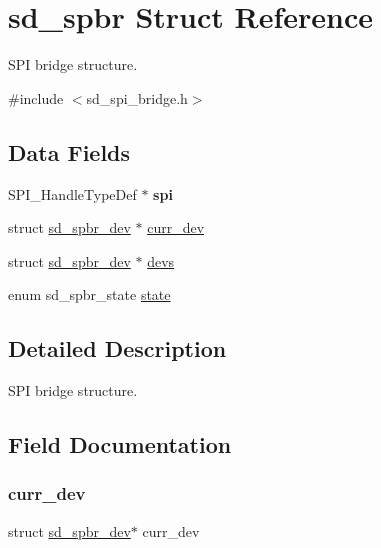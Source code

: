 \hypertarget{structsd__spbr}{}\section{sd\+\_\+spbr Struct Reference}
\label{structsd__spbr}


S\+PI bridge structure.  




{\ttfamily \#include $<$sd\+\_\+spi\+\_\+bridge.\+h$>$}

\subsection*{Data Fields}
\begin{DoxyCompactItemize}
\item 
\mbox{\label{structsd__spbr_a06909907ded69cbc00db1f401a90f8ee}} 
S\+P\+I\+\_\+\+Handle\+Type\+Def $\ast$ {\bfseries spi}
\item 
struct \mbox{\hyperlink{structsd__spbr__dev}{sd\+\_\+spbr\+\_\+dev}} $\ast$ \mbox{\hyperlink{structsd__spbr_ab3464a17b25faba49ad79ea9c48ea46f}{curr\+\_\+dev}}
\item 
struct \mbox{\hyperlink{structsd__spbr__dev}{sd\+\_\+spbr\+\_\+dev}} $\ast$ \mbox{\hyperlink{structsd__spbr_a621336d053dd14aaf9eb00348cfc8de0}{devs}}
\item 
enum sd\+\_\+spbr\+\_\+state \mbox{\hyperlink{structsd__spbr_a15ddc1ec640d62f5f08410710d83de8a}{state}}
\end{DoxyCompactItemize}


\subsection{Detailed Description}
S\+PI bridge structure. 

\subsection{Field Documentation}
\mbox{\label{structsd__spbr_ab3464a17b25faba49ad79ea9c48ea46f}} 
\subsubsection{\texorpdfstring{curr\+\_\+dev}{curr\_dev}}
{\footnotesize\ttfamily struct \mbox{\hyperlink{structsd__spbr__dev}{sd\+\_\+spbr\+\_\+dev}}$\ast$ curr\+\_\+dev}

